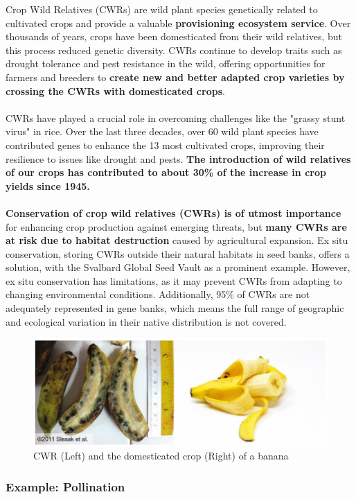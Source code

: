 \documentclass[../summary.tex]{subfiles}
\begin{document}
Crop Wild Relatives (CWRs) are wild plant species genetically related to cultivated crops and provide a valuable \textbf{provisioning ecosystem service}. Over thousands of years, crops have been domesticated from their wild relatives, but this process reduced genetic diversity. CWRs continue to develop traits such as drought tolerance and pest resistance in the wild, offering opportunities for farmers and breeders to \textbf{create new and better adapted crop varieties by crossing the CWRs with domesticated crops}.\\
\\
CWRs have played a crucial role in overcoming challenges like the "grassy stunt virus" in rice. Over the last three decades, over 60 wild plant species have contributed genes to enhance the 13 most cultivated crops, improving their resilience to issues like drought and pests. \textbf{The introduction of wild relatives of our crops has contributed to about 30\% of the increase in crop yields since 1945.}\\
\\
\textbf{Conservation of crop wild relatives (CWRs) is of utmost importance} for enhancing crop production against emerging threats, but \textbf{many CWRs are at risk due to habitat destruction} caused by agricultural expansion. Ex situ conservation, storing CWRs outside their natural habitats in seed banks, offers a solution, with the Svalbard Global Seed Vault as a prominent example. However, ex situ conservation has limitations, as it may prevent CWRs from adapting to changing environmental conditions. Additionally, 95\% of CWRs are not adequately represented in gene banks, which means the full range of geographic and ecological variation in their native distribution is not covered.

\begin{figure}[H]
	\centering
	\includegraphics[width=0.7\linewidth]{../images/Banana_CWR_and_domesticated}
	\caption{CWR (Left) and the domesticated crop (Right) of a banana}
	\label{fig:bananacwranddomesticated}
\end{figure}
\newpage

\subsubsection{Example: Pollination}
\end{document}
